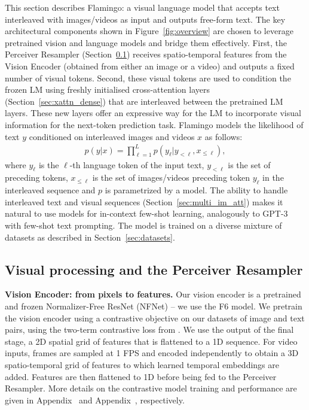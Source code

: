 This section describes Flamingo: a visual language model that accepts text interleaved with images/videos as input and outputs free-form text. %
The key architectural components shown in Figure~\ref{fig:overview}
are chosen to leverage pretrained vision and language models and bridge them effectively. 
First, the Perceiver Resampler (Section~\ref{sec:transformer_resampler}) receives spatio-temporal features from the Vision Encoder (obtained from either an image or a video) and outputs a fixed number of visual tokens.
Second, these visual tokens are used to condition the frozen LM using freshly initialised cross-attention layers (Section~\ref{sec:xattn_dense}) that are interleaved between the pretrained LM layers.
These new layers offer an expressive way for the LM to incorporate visual information for the next-token prediction task. %
Flamingo models the likelihood of text $y$ conditioned on interleaved  images and videos $x$ as follows:
\begin{align}
    p(y | x) = \prod_{\ell=1}^L p(y_\ell | y_{< \ell}, x_{\leq \ell}),
    \label{eq:modeling}
\end{align}
where $y_{\ell}$ is the $\ell$-th language token of the input text, $y_{<\ell}$ is the set of preceding tokens, $x_{\leq \ell}$ is the set of images/videos preceding token $y_{\ell}$ in the interleaved sequence and $p$ is parametrized by a \method{} model.
The ability to handle interleaved text and visual sequences (Section~\ref{sec:multi_im_att}) makes it natural to use \method{} models for in-context few-shot learning, analogously to GPT-3 with few-shot text prompting.
The model is trained on a diverse mixture of datasets as described in Section~\ref{sec:datasets}.





\subsection{Visual processing and the Perceiver Resampler}
\label{sec:transformer_resampler}

\noindent
\textbf{Vision Encoder: from pixels to features.}
Our vision encoder is a pretrained and frozen Normalizer-Free ResNet (NFNet) \citep{nfnets} -- we use the F6 model.
We pretrain the vision encoder using a contrastive objective on our datasets of image and text pairs, using the two-term contrastive loss from \citet{clip}.
We use the output of the final stage, a 2D spatial grid of features that is flattened to a 1D sequence.
For video inputs, frames are sampled at 1 FPS and encoded independently to obtain a 3D spatio-temporal grid of features to which learned temporal embeddings are added.
Features are then flattened to 1D before being fed to the Perceiver Resampler.
More details on the contrastive model training and performance are given in Appendix~ and Appendix~, respectively.

